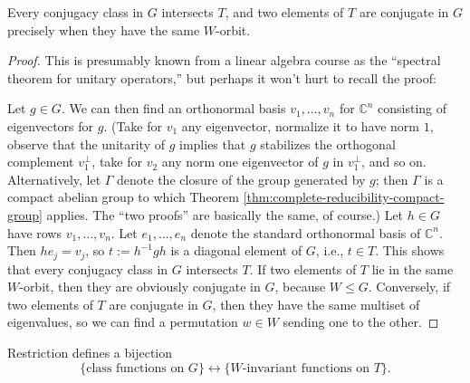 \documentclass[reqno]{amsart} 
\begin{document}
\begin{lemma}\label{lem:describe-conjugacy-classes-Un}
  Every conjugacy class in $G$ intersects $T$, and two elements of $T$ are conjugate in $G$ precisely when they have the same $W$-orbit.
\end{lemma}
\begin{proof}
  This is presumably known from a linear algebra course as the ``spectral theorem for unitary operators,'' but perhaps it won't hurt to recall the proof:
  
  Let $g \in G$.  We can then find an orthonormal basis $v_1,\dotsc,v_n$ for $\mathbb{C}^n$ consisting of eigenvectors for $g$.  (Take for $v_1$ any eigenvector, normalize it to have norm $1$, observe that the unitarity of $g$ implies that $g$ stabilizes the orthogonal complement $v_1^\perp$, take for $v_2$ any norm one eigenvector of $g$ in $v_1^\perp$, and so on.  Alternatively, let $\Gamma$ denote the closure of the group generated by $g$; then $\Gamma$ is a compact abelian group to which Theorem \ref{thm:complete-reducibility-compact-group} applies.  The ``two proofs'' are basically the same, of course.)  Let $h \in G$ have rows $v_1,\dotsc,v_n$.  Let $e_1,\dotsc,e_n$ denote the standard orthonormal basis of $\mathbb{C}^n$.  Then $h e_j = v_j$, so $t := h^{-1} g h$ is a diagonal element of $G$, i.e., $t \in T$.  This shows that every conjugacy class in $G$ intersects $T$.  If two elements of $T$ lie in the same $W$-orbit, then they are obviously conjugate in $G$, because $W \leq G$.  Conversely, if two elements of $T$ are conjugate in $G$, then they have the same multiset of eigenvalues, so we can find a permutation $w \in W$ sending one to the other.
\end{proof}

\begin{corollary}\label{cor:class-fns-via-T}
  Restriction defines a bijection
  \begin{equation*}
    \{\text{class functions on } G\} \leftrightarrow \{\text{$W$-invariant functions on } T\}.
  \end{equation*}
\end{corollary}
\end{document}
